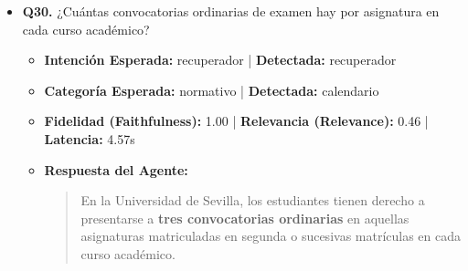 \documentclass[12pt,a4paper,oneside]{report}
\begin{document}
\begin{itemize}
\begin{itemize}
\begin{quote}
\begin{itemize}
  \item Artículo 1. Objeto y Artículo 2. Ámbito de aplicación (R.R. NORMAS DE MATRICULA GRADO Y MASTER UNIVERSITARIO 2025-2026.pdf, página 5)
  \item Artículo 20. Permanencia (R.R. NORMAS DE MATRICULA GRADO Y MASTER UNIVERSITARIO 2025-2026.pdf, página 13)
  \item Artículo 65. Enseñanzas universitarias de carácter oficial y Artículo 66. Acceso y permanencia en los centros (BOJA25-508-00085-6229-01\_00319829.pdf, página 37)
\end{itemize}
                \end{quote}
          \item \textbf{{Ground Truth (Referencia):}} \\
                \begin{quote}
El estudiante de grado a tiempo completo de nuevo ingreso debe superar un mínimo de 12 créditos (estudiantes a tiempo parcial mínimo 6 créditos) en su primer año académico.
                \end{quote}
          \item \textbf{{Referencias / Fuentes Utilizadas:}} \\
                \begin{itemize}
                  \item R.R. NORMAS DE MATRICULA GRADO Y MASTER UNIVERSITARIO 2025-2026.pdf (Página 3)
                  \item BOJA25-508-00085-6229-01\_00319829.pdf (Página 37)
                  \item R.R. NORMAS DE MATRICULA GRADO Y MASTER UNIVERSITARIO 2025-2026.pdf (Página 5)
                  \item R.R. NORMAS DE MATRICULA GRADO Y MASTER UNIVERSITARIO 2025-2026.pdf (Página 18)
                \end{itemize}
        \end{itemize}

  
\item \textbf{Q30.} ¿Cuántas convocatorias ordinarias de examen hay por asignatura en cada curso académico? \\
        \begin{itemize}
          \item \textbf{Intención Esperada:} recuperador | \textbf{Detectada:} recuperador
          \item \textbf{Categoría Esperada:} normativo | \textbf{Detectada:} calendario
          \item \textbf{Fidelidad (Faithfulness):} 1.00 | \textbf{Relevancia (Relevance):} 0.46 | \textbf{Latencia:} 4.57s
          \item \textbf{{Respuesta del Agente:}} \\
                \begin{quote}
En la Universidad de Sevilla, los estudiantes tienen derecho a presentarse a \textbf{tres convocatorias ordinarias} en aquellas asignaturas matriculadas en segunda o sucesivas matrículas en cada curso académico.


\end{quote}
\end{itemize}
\end{itemize}
\end{document}
